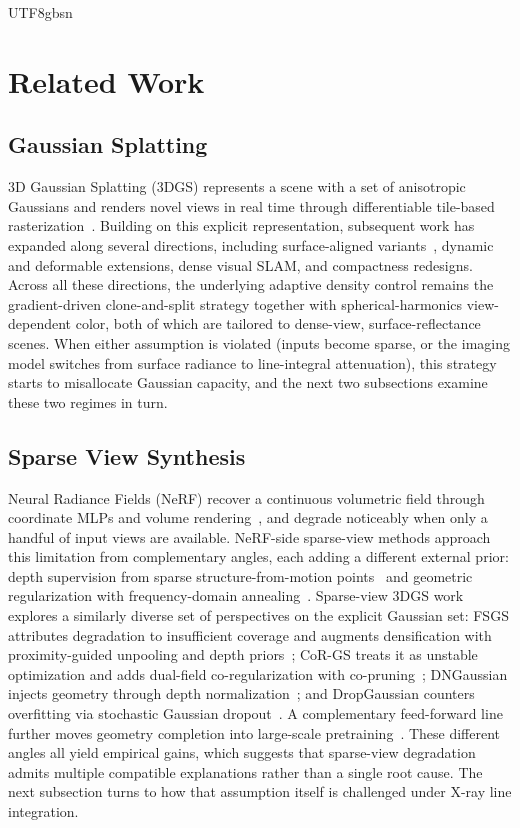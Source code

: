 \documentclass{egpubl}
\begin{document}
\begin{CJK*}{UTF8}{gbsn}
\section{Related Work}
\label{sec:related}

\subsection{Gaussian Splatting}

3D Gaussian Splatting (3DGS) represents a scene with a set of anisotropic Gaussians and renders novel views in real time through differentiable tile-based rasterization~\cite{kerbl20233d}. Building on this explicit representation, subsequent work has expanded along several directions, including surface-aligned variants~\cite{huang20242dgs,guedon2024sugar}, dynamic and deformable extensions, dense visual SLAM, and compactness redesigns. Across all these directions, the underlying adaptive density control remains the gradient-driven clone-and-split strategy together with spherical-harmonics view-dependent color, both of which are tailored to dense-view, surface-reflectance scenes. When either assumption is violated (inputs become sparse, or the imaging model switches from surface radiance to line-integral attenuation), this strategy starts to misallocate Gaussian capacity, and the next two subsections examine these two regimes in turn.

\subsection{Sparse View Synthesis}

Neural Radiance Fields (NeRF) recover a continuous volumetric field through coordinate MLPs and volume rendering~\cite{mildenhall2021nerf}, and degrade noticeably when only a handful of input views are available. NeRF-side sparse-view methods approach this limitation from complementary angles, each adding a different external prior: depth supervision from sparse structure-from-motion points~\cite{deng2022dsnerf} and geometric regularization with frequency-domain annealing~\cite{niemeyer2022regnerf}. Sparse-view 3DGS work explores a similarly diverse set of perspectives on the explicit Gaussian set: FSGS attributes degradation to insufficient coverage and augments densification with proximity-guided unpooling and depth priors~\cite{zhu2024fsgs}; CoR-GS treats it as unstable optimization and adds dual-field co-regularization with co-pruning~\cite{zhang2024cor}; DNGaussian injects geometry through depth normalization~\cite{li2024dn}; and DropGaussian counters overfitting via stochastic Gaussian dropout~\cite{park2025dropgaussian}. A complementary feed-forward line further moves geometry completion into large-scale pretraining~\cite{charatan2024pixelsplat}. These different angles all yield empirical gains, which suggests that sparse-view degradation admits multiple compatible explanations rather than a single root cause. The next subsection turns to how that assumption itself is challenged under X-ray line integration.


\end{CJK*}
\end{document}
